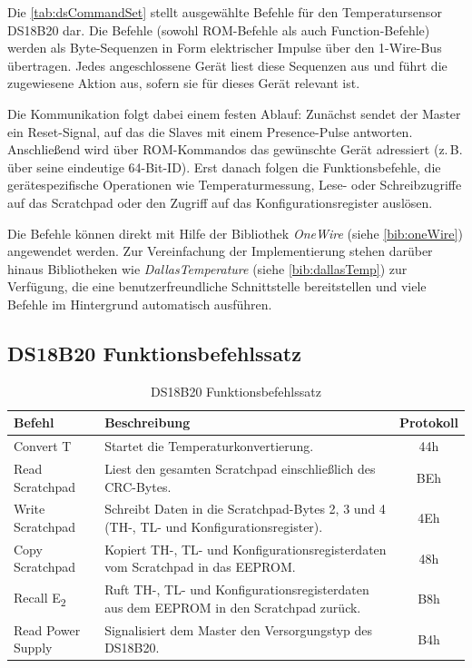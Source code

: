 	Die \autoref{tab:dsCommandSet} stellt ausgewählte Befehle für den Temperatursensor DS18B20 dar.
	Die Befehle (sowohl ROM-Befehle als auch Function-Befehle) werden als Byte-Sequenzen in Form elektrischer Impulse über den 1-Wire-Bus übertragen. Jedes angeschlossene Gerät liest diese Sequenzen aus und führt die zugewiesene Aktion aus, sofern sie für dieses Gerät relevant ist.

	Die Kommunikation folgt dabei einem festen Ablauf: Zunächst sendet der Master ein Reset-Signal, auf das die Slaves mit einem Presence-Pulse antworten. Anschlie{\ss}end wird über ROM-Kommandos das gewünschte Gerät adressiert (z.\,B. über seine eindeutige 64-Bit-ID). Erst danach folgen die Funktionsbefehle, die gerätespezifische Operationen wie Temperaturmessung, Lese- oder Schreibzugriffe auf das Scratchpad oder den Zugriff auf das Konfigurationsregister auslösen.
	
	Die Befehle können direkt mit Hilfe der Bibliothek \textit{OneWire} (siehe \autoref{bib:oneWire}) angewendet werden. Zur Vereinfachung der Implementierung stehen darüber hinaus Bibliotheken wie \textit{DallasTemperature} (siehe \autoref{bib:dallasTemp}) zur Verfügung, die eine benutzerfreundliche Schnittstelle bereitstellen und viele Befehle im Hintergrund automatisch ausführen.
	

\subsection{DS18B20 Funktionsbefehlssatz \label{dsCommandSet}}
\begin{table}[H]
	\centering
	\begin{tabularx}{\textwidth}{|l|X|c|}
		\hline
		\textbf{Befehl} & \textbf{Beschreibung} & \textbf{Protokoll} \\
		\hline
		Convert T & Startet die Temperaturkonvertierung. & 44h \\
		\hline
		Read Scratchpad & Liest den gesamten Scratchpad einschlie{\ss}lich des CRC-Bytes. & BEh \\
		\hline
		Write Scratchpad & Schreibt Daten in die Scratchpad-Bytes 2, 3 und 4 (TH-, TL- und Konfigurationsregister). & 4Eh \\
		\hline
		Copy Scratchpad & Kopiert TH-, TL- und Konfigurationsregisterdaten vom Scratchpad in das EEPROM. & 48h \\
		\hline
		Recall E\textsubscript{2} & Ruft TH-, TL- und Konfigurationsregisterdaten aus dem EEPROM in den Scratchpad zurück. & B8h \\
		\hline
		Read Power Supply & Signalisiert dem Master den Versorgungstyp des DS18B20. & B4h \\
		\hline
	\end{tabularx}
	\caption{DS18B20 Funktionsbefehlssatz}
	\label{tab:dsCommandSet}
\end{table}



